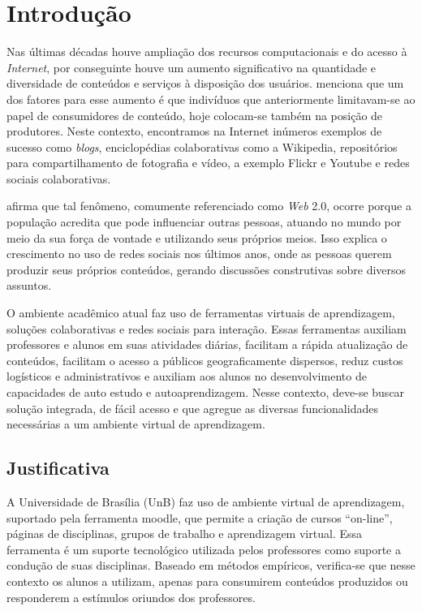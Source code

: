 \chapter{Introdução}
\label{cap-introducao}

Nas últimas décadas houve ampliação dos recursos computacionais e do acesso à \textit{Internet}, por conseguinte houve um aumento significativo na quantidade e diversidade de conteúdos e serviços à disposição dos usuários.  menciona que um dos fatores para esse aumento é que indivíduos que anteriormente limitavam-se ao papel de consumidores de conteúdo, hoje colocam-se também na posição de produtores. Neste contexto, encontramos na Internet inúmeros exemplos de sucesso como \textit{blogs}, enciclopédias colaborativas como a Wikipedia, repositórios para compartilhamento de fotografia e vídeo, a exemplo Flickr e Youtube e redes sociais colaborativas.

 afirma que tal fenômeno, comumente referenciado como \textit{Web} 2.0, ocorre porque a população acredita que pode influenciar outras pessoas, atuando no mundo por meio da sua força de vontade e utilizando seus próprios meios. Isso explica o crescimento no uso de redes sociais nos últimos anos, onde as pessoas querem produzir seus próprios conteúdos, gerando discussões construtivas sobre diversos assuntos.


O ambiente acadêmico atual faz uso de ferramentas virtuais de aprendizagem, soluções colaborativas e redes sociais para interação. Essas ferramentas auxiliam professores e alunos em suas atividades diárias, facilitam a rápida atualização de conteúdos, facilitam o acesso a públicos geograficamente dispersos, reduz custos logísticos e administrativos e auxiliam aos alunos no desenvolvimento de capacidades de auto estudo e autoaprendizagem. Nesse contexto, deve-se buscar solução integrada, de fácil acesso e que agregue  as diversas funcionalidades necessárias a um ambiente virtual de aprendizagem.

\section{Justificativa}

A Universidade de Brasília (UnB) faz uso de ambiente virtual de aprendizagem, suportado pela ferramenta moodle, que permite a criação de cursos ``on-line'', páginas de disciplinas, grupos de trabalho e aprendizagem virtual. Essa ferramenta é um suporte tecnológico utilizada pelos professores como suporte a condução de suas disciplinas. Baseado em métodos empíricos, verifica-se que nesse contexto os alunos a utilizam, apenas para consumirem conteúdos produzidos ou responderem a estímulos oriundos dos professores.

